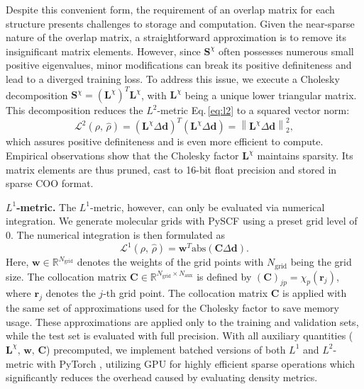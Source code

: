 \documentclass[%
reprint,
superscriptaddress,
bibnotes,
amsmath,amssymb,
aps,
floatfix, %
]{revtex4-2}
\begin{document}
Despite this convenient form, the requirement of an overlap matrix for each structure presents challenges to storage and computation. Given the near-sparse nature of the overlap matrix, a straightforward approximation is to remove its insignificant matrix elements. However, since $\mathbf{S}^\chi$ often possesses numerous small positive eigenvalues, minor modifications can break its positive definiteness and lead to a diverged training loss. To address this issue, we execute a Cholesky decomposition $\mathbf{S}^\chi = ({\mathbf{L}^\chi})^T {\mathbf{L}^\chi}$, with ${\mathbf{L}^\chi}$ being a unique lower triangular matrix. This decomposition reduces the $L^2$-metric Eq.\,\eqref{eq:l2} to a squared vector norm:
\begin{equation}
  \mathcal{L}^2(\rho,\,\hat{\rho}) = ({\mathbf{L}^\chi}\Delta \mathbf{d} )^T ({\mathbf{L}^\chi}\Delta \mathbf{d} ) = \left\| {\mathbf{L}^\chi}\Delta \mathbf{d}\right\|_2^2,
\end{equation}
which assures positive definiteness and is even more efficient to compute. Empirical observations show that the Cholesky factor ${\mathbf{L}^\chi}$ maintains sparsity. Its matrix elements are thus pruned, cast to 16-bit float precision and stored in sparse COO format.

\vspace{\baselineskip}
\noindent \textbf{$L^1$-metric.} The $L^1$-metric, however, can only be evaluated via numerical integration. We generate molecular grids with PySCF using a preset grid level of 0. The numerical integration is then formulated as
\begin{equation}
  \mathcal{L}^1(\rho,\,\hat{\rho}) = \mathbf{w}^T \text{abs}(\mathbf{C} \Delta\mathbf{d}).
\end{equation}
Here, $\mathbf{w} \in \mathbb{R}^{N_\text{grid}}$ denotes the weights of the grid points with $N_\text{grid}$ being the grid size. The collocation matrix $\mathbf{C} \in \mathbb{R}^{N_\text{grid}\times N_\text{aux}}$ is defined by $(\mathbf{C})_{jp} = \chi_p(\bm{r}_j)$, where $\bm{r}_j$ denotes the $j$-th grid point. The collocation matrix $\mathbf{C}$ is applied with the same set of approximations used for the Cholesky factor to save memory usage. These approximations are applied only to the training and validation sets, while the test set is evaluated with full precision. With all auxiliary quantities ($\mathbf{L}^\chi,\,\mathbf{w},\, \mathbf{C}$) precomputed, we implement batched versions of both $L^1$ and $L^2$-metric with PyTorch \cite{paszke2019pytorch}, utilizing GPU for highly efficient sparse operations which significantly reduces the overhead caused by evaluating density metrics.
\end{document}
